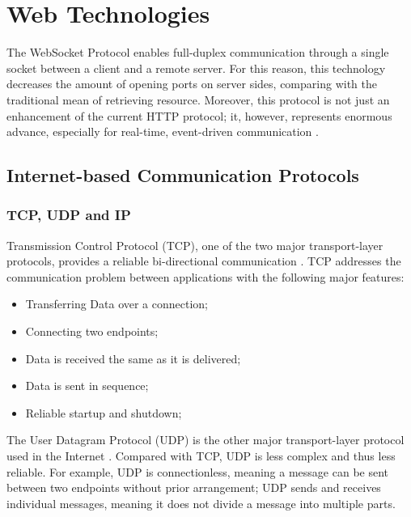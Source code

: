 \chapter{Web Technologies}
\label{chapter:WebTechnologies} 

The WebSocket Protocol enables full-duplex communication through a single socket between a client and a remote server. For this reason, this technology decreases the amount of opening ports on server sides, comparing with the traditional mean of retrieving resource. Moreover, this protocol is not just an enhancement of the current HTTP protocol; it, however, represents enormous advance, especially for real-time, event-driven communication \cite{lubbers2010html5}.

\section{Internet-based Communication Protocols}

\subsection{TCP, UDP and IP}
Transmission Control Protocol (TCP), one of the two major transport-layer protocols, provides a reliable bi-directional communication \cite{comer2008computer}. TCP addresses the communication problem between applications with the following major features: 

\begin{itemize}
\setlength{\itemsep}{0pt}
\item Transferring Data over a connection;
\item Connecting two endpoints;
\item Data is received the same as it is delivered;
\item Data is sent in sequence;
\item Reliable startup and shutdown;
\end{itemize}

The User Datagram Protocol (UDP) is the other major transport-layer protocol used in the Internet \cite{comer2008computer}. Compared with TCP, UDP is less complex and thus less reliable. For example, UDP is connectionless, meaning a message can be sent between two endpoints without prior arrangement; UDP sends and receives individual messages, meaning it does not divide a message into multiple parts.

